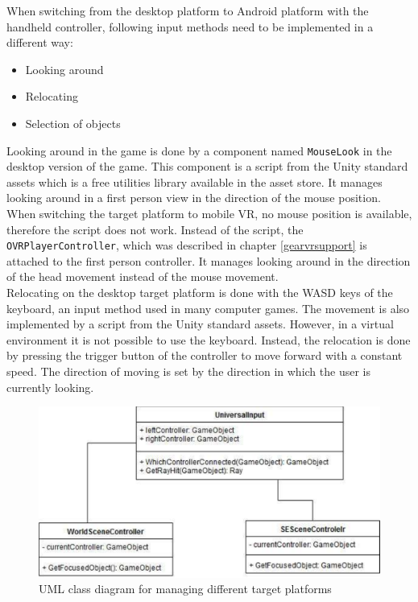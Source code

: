 When switching from the desktop platform to Android platform with the handheld controller, following input methods need to be implemented in a different way:
\begin{itemize}
\item Looking around
\item Relocating
\item Selection of objects
\end{itemize}
Looking around in the game is done by a component named \texttt{MouseLook} in the desktop version of the game. This component is a script from the Unity standard assets which is a free utilities library available in the asset store. It manages looking around in a first person view in the direction of the mouse position. When switching the target platform to mobile VR, no mouse position is available, therefore the script does not work. Instead of the  script, the \texttt{OVRPlayerController}, which was described in chapter \ref{gearvrsupport} is attached to the first person controller. It manages looking around in the direction of the head movement instead of the mouse movement.\\
Relocating on the desktop target platform is done with the WASD keys of the keyboard, an input method used in many computer games. The movement is also implemented by a script from the Unity standard assets. However, in a virtual environment it is not possible to use the keyboard. Instead, the relocation is done by pressing the trigger button of the controller to move forward with a constant speed. The direction of moving is set by the direction in which the user is currently looking.\\
\begin{figure}[h!]
  \includegraphics[width=13cm]{kapitel/eps/uml-input.pdf}
  \centering
  \caption{UML class diagram for managing different target platforms}
  \label{fig:uml-universalinput}
\end{figure}
